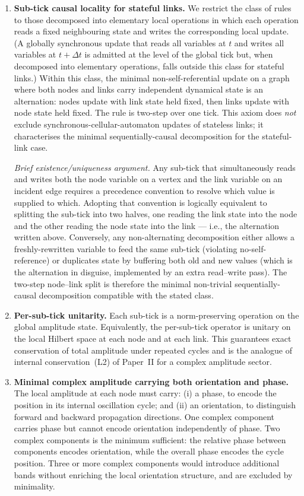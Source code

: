 \documentclass[11pt,a4paper]{article}
\begin{document}
\begin{enumerate}[label=(F\arabic*)]
\item \textbf{Sub-tick causal locality for stateful links.}
We restrict the class of rules to those decomposed into
elementary local operations in which each operation reads a
fixed neighbouring state and writes the corresponding local
update. (A globally synchronous update that reads all variables
at $t$ and writes all variables at $t+\Delta t$ is admitted at
the level of the global tick but, when decomposed into
elementary operations, falls outside this class for stateful
links.) Within this class, the minimal non-self-referential
update on a graph where both nodes and links carry independent
dynamical state is an alternation: nodes update with link state
held fixed, then links update with node state held fixed. The
rule is two-step over one tick. This axiom does \emph{not}
exclude synchronous-cellular-automaton updates of stateless
links; it characterises the minimal sequentially-causal
decomposition for the stateful-link case.

\smallskip
\noindent\emph{Brief existence/uniqueness argument.}
Any sub-tick that simultaneously reads and writes both the
node variable on a vertex and the link variable on an
incident edge requires a precedence convention to resolve which
value is supplied to which. Adopting that convention is
logically equivalent to splitting the sub-tick into two halves,
one reading the link state into the node and the other reading
the node state into the link --- i.e., the alternation written
above. Conversely, any non-alternating decomposition either
allows a freshly-rewritten variable to feed the same sub-tick
(violating no-self-reference) or duplicates state by buffering
both old and new values (which is the alternation in disguise,
implemented by an extra read--write pass). The two-step
node--link split is therefore the minimal non-trivial
sequentially-causal decomposition compatible with the stated
class.

\item \textbf{Per-sub-tick unitarity.}
Each sub-tick is a norm-preserving operation on the global
amplitude state. Equivalently, the per-sub-tick operator is
unitary on the local Hilbert space at each node and at each
link. This guarantees exact conservation of total amplitude
under repeated cycles and is the analogue of internal
conservation~(L2) of Paper~II for a complex amplitude sector.

\item \textbf{Minimal complex amplitude carrying both
orientation and phase.}
The local amplitude at each node must carry: (i) a phase, to
encode the position in its internal oscillation cycle; and
(ii) an orientation, to distinguish forward and backward
propagation directions. One complex component carries phase
but cannot encode orientation independently of phase. Two
complex components is the minimum sufficient: the relative
phase between components encodes orientation, while the
overall phase encodes the cycle position. Three or more
complex components would introduce additional bands without
enriching the local orientation structure, and are excluded
by minimality.


\end{enumerate}
\end{document}

